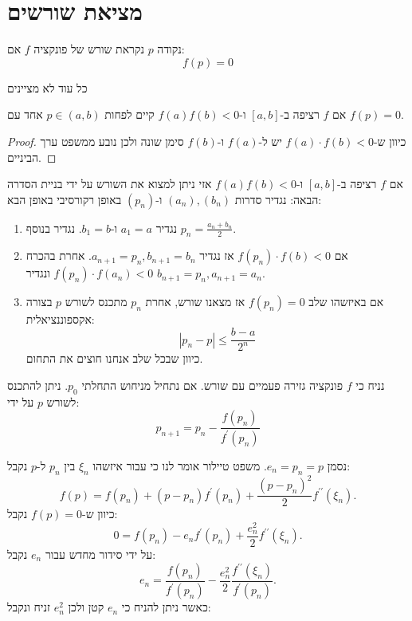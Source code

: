 \documentclass{tstextbook}
\begin{document}
\section{מציאת שורשים}

\begin{definition}
נקודה \(p\) נקראת שורש של פונקציה \(f\) אם:
$$f(p)=0$$

\end{definition}
\begin{remark}
כל עוד לא מציינים

\end{remark}
\begin{lemma}
אם \(f\) רציפה ב-\([a,b]\) ו-\(f(a)f(b)< 0\) קיים לפחות \(p \in (a,b)\) אחד עם \(f(p)=0\).

\end{lemma}
\begin{proof}
כיוון ש-\(f(a)\cdot f(b)< 0\) יש ל-\(f(a)\) ו-\(f(b)\) סימן שונה ולכן נובע ממשפט ערך הביניים. 

\end{proof}
\begin{proposition}
אם \(f\) רציפה ב-\([a,b]\) ו-\(f(a)f(b)< 0\) אזי ניתן למצוא את השורש על ידי בניית הסדרה הבאה:
נגדיר סדרות \((a_{n}),(b_{n})\) ו-\((p_{n})\) באופן רקורסיבי באופן הבא:

  \begin{enumerate}
    \item נגדיר \(a_{1}=a\) ו-\(b_{1}=b\). נגדיר בנוסף \(p_{n}=\frac{a_{n}+b_{n}}{2}\). 


    \item אם \(f(p_{n})\cdot f(b)< 0\) אז נגדיר \(a_{n+1}=p_{n},b_{n+1}=b_{n}\). אחרת בהכרח \(f(p_{n})\cdot f(a_{n})< 0\) ונגדיר \(b_{n+1}=p_{n},a_{n+1}=a_{n}\). 


    \item אם באיזשהו שלב \(f(p_{n})=0\) אז מצאנו שורש, אחרת \(p_{n}\) מתכנס לשורש \(p\) בצורה אקספוננציאלית: 
$$|p_{n}-p|\leq{\frac{b-a}{2^{n}}}$$
כיוון שבכל שלב אנחנו חוצים את התחום.


  \end{enumerate}
\end{proposition}
\begin{proposition}
נניח כי \(f\) פונקציה גזירה פעמיים עם שורש. אם נתחיל מניחוש התחלתי \(p_{0}\). ניתן להתכנס לשורש \(p\) על ידי:
$$p_{n+1}=p_{n}-{\frac{f(p_{n})}{f^{\prime}(p_{n})}}$$

\end{proposition}
נסמן \(e_{n}=p_{n}=p\). משפט טיילור אומר לנו כי עבור איזשהו \(\xi_{n}\) בין \(p_{n}\) ל-\(p\) נקבל:
$$f(p)=f(p_{n})+(p-p_{n})f^{\prime}(p_{n})+{\frac{(p-p_{n})^{2}}{2}}f^{\prime\prime}(\xi_{n}).$$
כיוון ש-\(f(p)=0\) נקבל:
$$0=f(p_{n})-e_{n}f^{\prime}(p_{n})+\frac{e_{n}^{2}}{2}f^{\prime\prime}(\xi_{n}).$$
על ידי סידור מחדש עבור \(e_{n}\) נקבל:
$$e_{n}=\frac{f(p_{n})}{f^{\prime}(p_{n})}-\frac{e_{n}^{2}}{2}\frac{f^{\prime\prime}(\xi_{n})}{f^{\prime}(p_{n})}.$$
כאשר ניתן להניח כי \(e_{n}\) קטן ולכן \(e_{n}^{2}\) זניח ונקבל:
\end{document}
